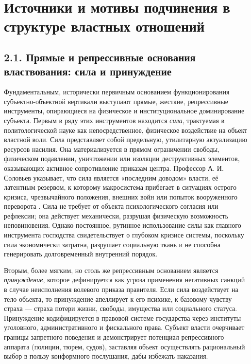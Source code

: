 \section{Источники и мотивы подчинения в структуре властных отношений}

\subsection{2.1. Прямые и репрессивные основания властвования: сила и принуждение}

Фундаментальным, исторически первичным основанием функционирования субъектно-объектной вертикали выступают прямые, жесткие, репрессивные инструменты, опирающиеся на физическое и институциональное доминирование субъекта. Первым в ряду этих инструментов находится \textit{сила}, трактуемая в политологической науке как непосредственное, физическое воздействие на объект властной воли. Сила представляет собой предельную, утилитарную актуализацию ресурсов насилия. Она материализуется в прямом ограничении свободы, физическом подавлении, уничтожении или изоляции деструктивных элементов, оказывающих активное сопротивление приказам центра. Профессор А. И. Соловьев указывает, что сила является «последним доводом» власти, её латентным резервом, к которому макросистема прибегает в ситуациях острого кризиса, чрезвычайного положения, внешних войн или попыток вооруженного переворота \cite{Solovyev}. Сила не требует от объекта психологического согласия или рефлексии; она действует механически, разрушая физическую возможность неповиновения. Однако постоянное, рутинное использование силы как главного инструмента господства свидетельствует о глубоком кризисе системы, поскольку сила экономически затратна, разрушает социальную ткань и не способна генерировать долговременный внутренний порядок.

Вторым, более мягким, но столь же репрессивным основанием является \textit{принуждение}, которое дефинируется как угроза применения негативных санкций в случае неисполнения волевого приказа правителя. Если сила воздействует на тело объекта, то принуждение апеллирует к его психике, к базовому чувству страха — страха потери жизни, свободы, имущества или социального статуса. Принуждение кодифицируется в правовой системе государства через институты уголовного, административного и фискального права. Субъект власти очерчивает границы запретного поведения и демонстрирует потенциал репрессивного аппарата (полиции, тюрем, судов), заставляя объект осуществлять рациональный выбор в пользу конформного послушания, дабы избежать наказания.


